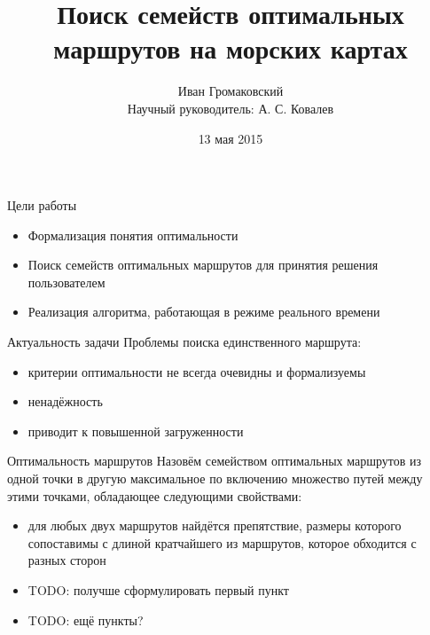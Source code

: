 \documentclass[mathserif]{beamer}
\title{Поиск семейств оптимальных маршрутов на морских картах}
\author{Иван Громаковский \\
Научный руководитель: А. С. Ковалев}
\institute{Санкт-Петербургский национальный исследовательский университет \\ информационных технологий, механики и оптики}
\date{13 мая 2015}
\begin{document}
\frame{\titlepage}

\begin{frame}{Цели работы}
    \begin{itemize}[<+->]
        \item Формализация понятия оптимальности
        \item Поиск семейств оптимальных маршрутов для принятия
          решения пользователем
        \item Реализация алгоритма, работающая в режиме реального времени
    \end{itemize}
\end{frame}

\begin{frame}{Актуальность задачи}
    Проблемы поиска единственного маршрута:
    \begin{itemize}[<+->]
        \item критерии оптимальности не всегда очевидны и формализуемы
        \item ненадёжность
        \item приводит к повышенной загруженности
    \end{itemize}
\end{frame}
        
\begin{frame}{Оптимальность маршрутов}
    Назовём семейством оптимальных маршрутов из одной точки в другую 
    максимальное по включению множество путей между этими точками,
    обладающее следующими свойствами:
    \begin{itemize}[<+->]
        \item для любых двух маршрутов найдётся препятствие, размеры
          которого сопоставимы с длиной кратчайшего из маршрутов,
          которое обходится с разных сторон
        \item TODO: получше сформулировать первый пункт
        \item TODO: ещё пункты?
    \end{itemize}
\end{frame}
\end{document}

